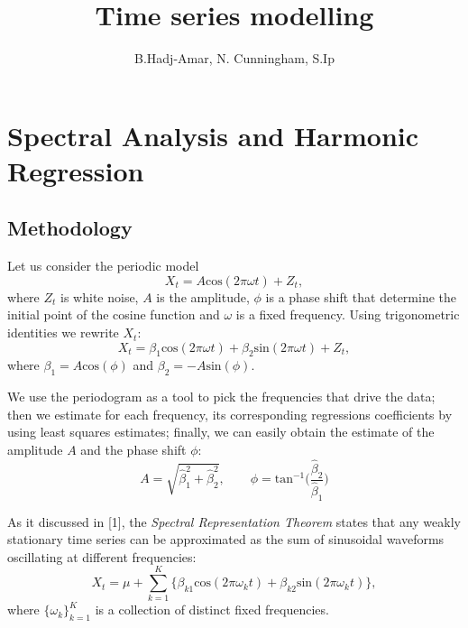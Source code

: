 \documentclass[]{article}
\title{Time series modelling}
\author{B.Hadj-Amar, N. Cunningham, S.Ip}
\begin{document}
\maketitle

\begin{abstract}

\end{abstract}

\section{Spectral Analysis and Harmonic Regression}
\subsection{Methodology}
Let us consider the periodic model
\begin{equation*}
X_t = A\text{cos}(2\pi\omega t) + Z_t,
\end{equation*} 
where $Z_t$ is white noise, $A$ is the amplitude, $\phi$ is a phase shift that determine the initial point of the cosine function and $\omega$ is a fixed frequency. 
Using trigonometric identities we rewrite $X_t$:
\begin{equation}
X_t = \beta_1\text{cos}(2\pi\omega t) + \beta_2\text{sin}(2\pi\omega t) + Z_t,
\end{equation}
where $\beta_1 = A\text{cos}(\phi)$ and $\beta_2 = -A\text{sin}(\phi)$.

We use the periodogram as a tool to pick the frequencies that drive the data; then we estimate for each frequency, its corresponding regressions coefficients by using least squares estimates; finally, we can easily obtain the estimate of the amplitude $ A$ and the phase shift $\phi$:
\begin{equation}
A = \sqrt{\hat{\beta}_1^2 + \hat{\beta}_2^2}, \qquad \phi = \text{tan}^{-1}\Big(\frac{\hat{\beta}_2}{\hat{\beta}_1}\Big)
\end{equation}

As it discussed in [1], the \textit{Spectral Representation Theorem} states that any weakly stationary time series can be approximated as the
sum of sinusoidal waveforms oscillating at different frequencies:
\begin{equation}
X_{t} = \mu + \sum_{k = 1}^{K} \big\{ \beta_{k 1}\text{cos}(2\pi\omega_k t) + \beta_{k 2}\text{sin}(2\pi\omega_k t) \big\},
\end{equation}
where $\{\omega_k\}_{k = 1}^{K}$ is a collection of distinct fixed frequencies.
\vspace{0.1cm}
\end{document}
